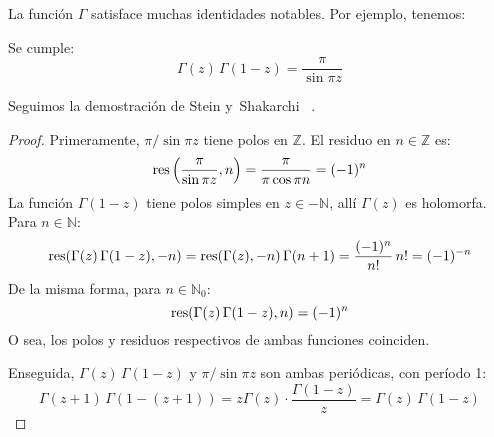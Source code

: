   La función \(\Gamma\) satisface muchas identidades notables.
  Por ejemplo,
  tenemos:
  \begin{theorem}
    Se cumple:
    \begin{equation}
      \label{eq:Gamma-reflection}
      \Gamma(z) \, \Gamma(1 - z)
	= \frac{\pi}{\sin \pi z}
      \end{equation}
  \end{theorem}
  Seguimos la demostración de Stein y~Shakarchi~%
    \cite{stein10:_compl_analy}.
  \begin{proof}
    Primeramente, \(\pi / \sin \pi z\)
    tiene polos en \(\mathbb{Z}\).
    El residuo en \(n \in \mathbb{Z}\) es:
    \begin{equation*}
      \operatorname{res} \left( \frac{\pi}{\sin \pi z}, n \right)
	= \frac{\pi}{\pi \cos \pi n}
	= (-1)^n
    \end{equation*}
    La función \(\Gamma(1 - z)\) tiene polos simples
    en \(z \in - \mathbb{N}\),
    allí \(\Gamma(z)\) es holomorfa.
    Para \(n \in \mathbb{N}\):
    \begin{equation*}
      \operatorname{res}(\Gamma(z) \, \Gamma(1 - z), - n)
	= \operatorname{res}(\Gamma(z), -n) \, \Gamma(n + 1)
	= \frac{(-1)^n}{n!} \, n!
	= (-1)^{-n}
    \end{equation*}
    De la misma forma,
    para \(n \in \mathbb{N}_0\):
    \begin{equation*}
      \operatorname{res}(\Gamma(z) \, \Gamma(1 - z), n)
	= (-1)^n
    \end{equation*}
    O sea,
    los polos y residuos respectivos de ambas funciones coinciden.

    Enseguida,
    \(\Gamma(z) \, \Gamma(1 - z)\)
    y \(\pi / \sin \pi z\) son ambas periódicas,
    con período 1:
    \begin{equation*}
      \Gamma(z + 1) \, \Gamma(1 - (z + 1))
	= z \Gamma(z) \cdot \frac{\Gamma(1 - z)}{z}
	= \Gamma(z) \, \Gamma(1 - z)
    \end{equation*}


\end{proof}

